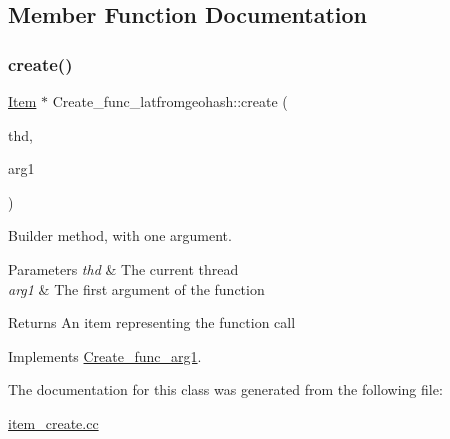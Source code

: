 \subsection{Member Function Documentation}
\mbox{\label{classCreate__func__latfromgeohash_a61830c8a1bcb8b067cab1034944b05b6}} 
\subsubsection{\texorpdfstring{create()}{create()}}
{\footnotesize\ttfamily \mbox{\hyperlink{classItem}{Item}} $\ast$ Create\+\_\+func\+\_\+latfromgeohash\+::create (\begin{DoxyParamCaption}\item[{T\+HD $\ast$}]{thd,  }\item[{\mbox{\hyperlink{classItem}{Item}} $\ast$}]{arg1 }\end{DoxyParamCaption})\hspace{0.3cm}{\ttfamily [virtual]}}

Builder method, with one argument. 
\begin{DoxyParams}{Parameters}
{\em thd} & The current thread \\
\hline
{\em arg1} & The first argument of the function \\
\hline
\end{DoxyParams}
\begin{DoxyReturn}{Returns}
An item representing the function call 
\end{DoxyReturn}


Implements \mbox{\hyperlink{classCreate__func__arg1_a3e9a98f755cd82c3e762e334c955a8c9}{Create\+\_\+func\+\_\+arg1}}.



The documentation for this class was generated from the following file\+:\begin{DoxyCompactItemize}
\item 
\mbox{\hyperlink{item__create_8cc}{item\+\_\+create.\+cc}}\end{DoxyCompactItemize}

